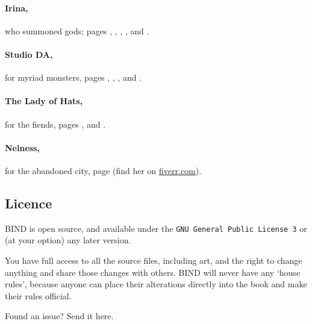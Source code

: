 \begin{multicols}{2}
\paragraph{Irina,}
who summoned gods; pages
\pageref{Irina/old_age},
\pageref{Irina/justice},
\pageref{Irina/forest},
\pageref{Irina/fury},
and
\pageref{Irina/curiosity}.

\paragraph{Studio DA,}
for myriad monsters,
pages
\pageref{Studio_DA/chitincrawler}, 
\pageref{Studio_DA/woodspy},
\pageref{Studio_DA/ogre},
and
\pageref{Studio_DA/jelly}.

\paragraph{The Lady of Hats,}
for the fiends,
pages
\pageref{loh/dryad}, 
and
\pageref{loh/dragon}.

\paragraph{Nelness,}
for the abandoned city,
page
\pageref{Nelness/city}
(find her on \href{https://www.fiverr.com/nelnes}{fiverr.com}).

\subsection*{Licence}

BIND is open source, and available under the {\tt GNU General Public License 3} or (at your option) any later version.

You have full access to all the source files, including art, and the right to change anything and share those changes with others.
BIND will never have any `house rules', because anyone can place their alterations directly into the book and make their rules official.

\begin{center}
  
  Found an issue?
  Send it here.
\end{center}

\end{multicols}
